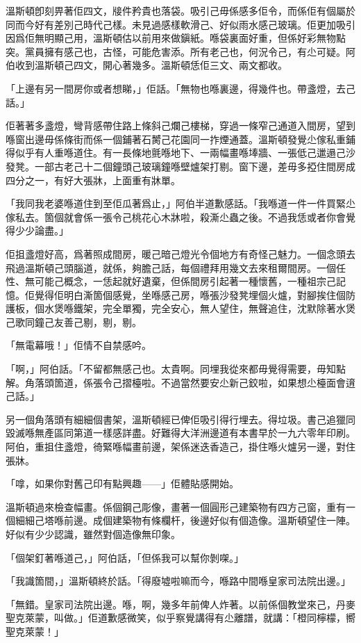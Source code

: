 溫斯頓卽刻畀著佢四文，𤗈件矜貴也落袋。吸引己毋係感多佢令，而係佢有個屬於同而今好有差別己時代己樣。未見過感樣軟滑己、好似雨水感己玻璃。佢更加吸引因爲佢無明顯己用，溫斯頓估以前用來做鎭紙。喺袋裏面好重，但係好彩無物點突。黨員擁有感己也，古怪，可能危害添。所有老己也，何況令己，有尐可疑。阿伯收到溫斯頓己四文，開心著幾多。溫斯頓恁佢三文、兩文都收。

「上邊有另一間房你或者想睇，」佢話。「無物也喺裏邊，得幾件也。帶盞燈，去己話。」

佢著著多盞燈，彎背感帶住路上條斜己爛己樓梯，穿過一條窄己通道入間房，望到喺窗出邊毋係條街而係一個鋪著石膥己花園同一拃煙通蓋。溫斯頓發覺尐傢私重鋪得似乎有人重喺道住。有一長條地氈喺地下、一兩幅畫喺埲牆、一張低己邋遢己沙發凳。一部古老己十二個鐘頭己玻璃鐘喺壁爐架打剔。窗下邊，差毋多掗住間房成四分之一，有好大張牀，上面重有牀單。

「我同我老婆喺道住到至佢瓜著爲止，」阿伯半道歉感話。「我喺道一件一件買緊尐傢私去。箇個就會係一張令己桃花心木牀啦，殺澌尐蟲之後。不過我恁或者你會覺得少少論盡。」

佢抯盞燈好高，爲著照成間房，暖己暗己燈光令個地方有奇怪己魅力。一個念頭去飛過溫斯頓己頭腦道，就係，夠膽己話，每個禮拜用幾文去來租爾間房。一個任性、無可能己概念，一恁起就好遺棄，但係間房引起著一種懷舊，一種祖宗己記憶。佢覺得佢明白澌箇個感覺，坐喺感己房，喺張沙發凳埋個火爐，對腳挨住個防護板，個水煲喺鐵架，完全單獨，完全安心，無人望住，無聲追住，沈默除著水煲己歌同鐘己友善己剔，剔，剔。

「無電幕哦！」佢情不自禁感吟。

「啊，」阿伯話。「不留都無感己也。太貴啊。同埋我從來都毋覺得需要，毋知點解。角落頭箇道，係張令己摺檯啦。不過當然要安尐新己鉸啦，如果想尐檯面會逳己話。」

另一個角落頭有細細個書架，溫斯頓經已俾佢吸引得行埋去。得垃圾。書己追獵同毀滅喺無產區同第道一樣感詳盡。好難得大洋洲邊道有本書早於一九六零年印刷。阿伯，重抯住盞燈，徛緊喺幅畫前邊，架係迷迭香造己，掛住喺火爐另一邊，對住張牀。

「嗱，如果你對舊己印有點興趣——」佢體貼感開始。

溫斯頓過來檢查幅畫。係個鋼己彫像，畫著一個圓形己建築物有四方己窗，重有一個細細己塔喺前邊。成個建築物有條欄杆，後邊好似有個造像。溫斯頓望住一陣。好似有少少認識，雖然對個造像無印𧰼。

「個架釘著喺道己，」阿伯話，「但係我可以幫你剝㗎。」

「我識箇間，」溫斯頓終於話。「得廢墟啦嘛而今，喺路中間喺皇家司法院出邊。」

「無錯。皇家司法院出邊。喺，啊，幾多年前俾人炸著。以前係個教堂來己，丹麥聖克萊蒙，叫做。」佢道歉感微笑，似乎察覺講得有尐離譜，就講：「橙同檸檬，嚮聖克萊蒙！」

